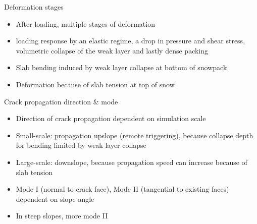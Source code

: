 \documentclass[11pt,aspectratio=169]{beamer}
\begin{document}
\begin{frame}{Deformation stages}
    \begin{itemize}
        \item After loading, multiple stages of deformation
        \item loading response by an elastic regime, a drop in pressure and shear stress, volumetric collapse of the weak layer and lastly dense packing \parencite{gaumeDynamicAnticrackPropagation2018}
        \item Slab bending induced by weak layer collapse at bottom of snowpack \parencite{bergfeldSignaturesSubRayleighSupershear2025}
        \item Deformation because of slab tension at top of snow \parencite{bergfeldSignaturesSubRayleighSupershear2025}

    \end{itemize}
    
\end{frame}


\begin{frame}{Crack propagation direction \& mode}
\begin{itemize}
    \item Direction of crack propagation dependent on simulation scale \parencite{trottetTransitionSubRayleighAnticrack2022}
    \item Small-scale: propagation upslope (remote triggering), because collapse depth for bending limited by weak layer collapse \parencite{trottetTransitionSubRayleighAnticrack2022}
    \item Large-scale: downslope, because propagation speed can increase because of slab tension \parencite{trottetTransitionSubRayleighAnticrack2022}
    \item Mode I (normal to crack face), Mode II (tangential to existing faces) dependent on slope angle \parencite{rosendahlModelingSnowSlab2020}
    \item In steep slopes, more mode II \parencite{rosendahlModelingSnowSlab2020}
\end{itemize}
\end{frame}
\end{document}
